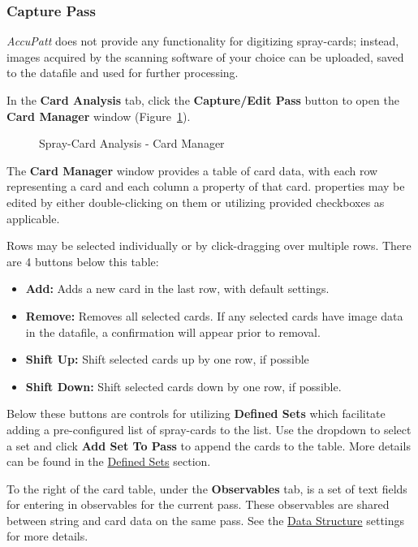 \documentclass[10pt,letterpaper,titlepage]{article}
\begin{document}
    \subsubsection{Capture Pass}
    \textit{AccuPatt} does not provide any functionality for digitizing spray-cards; instead, images acquired by the scanning software of your choice can be uploaded, saved to the datafile and used for further processing.\par
    In the \textbf{Card Analysis} tab, click the \textbf{Capture/Edit Pass} button to open the \textbf{Card Manager} window (Figure~\ref{fig:card_manager}).\par 
    \begin{figure}[h]
        \centering
        \caption{Spray-Card Analysis - Card Manager}
        \label{fig:card_manager}
    \end{figure}
    The \textbf{Card Manager} window provides a table of card data, with each row representing a card and each column a property of that card. properties may be edited by either double-clicking on them or utilizing provided checkboxes as applicable.\par
    Rows may be selected individually or by click-dragging over multiple rows. There are 4 buttons below this table:
    \begin{itemize}
        \item \textbf{Add:} Adds a new card in the last row, with default settings.
        \item \textbf{Remove:} Removes all selected cards. If any selected cards have image data in the datafile, a confirmation will appear prior to removal.
        \item \textbf{Shift Up:} Shift selected cards up by one row, if possible
        \item \textbf{Shift Down:} Shift selected cards down by one row, if possible.
    \end{itemize}
    Below these buttons are controls for utilizing \textbf{Defined Sets} which facilitate adding a pre-configured list of spray-cards to the list. Use the dropdown to select a set and click \textbf{Add Set To Pass} to append the cards to the table. More details can be found in the \hyperref[sec:defined_sets]{Defined Sets} section.\par
    To the right of the card table, under the \textbf{Observables} tab, is a set of text fields for entering in observables for the current pass. These observables are shared between string and card data on the same pass. See the \hyperref[sec:data]{Data Structure} settings for more details.\par
\end{document}
